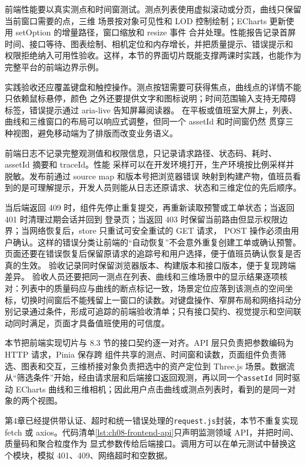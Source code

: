 前端性能要以真实测点和时间窗测试。测点列表使用虚拟滚动或分页，曲线只保留当前窗口需要的点，三维
场景按对象可见性和 LOD 控制绘制；ECharts 更新使用 setOption 的增量路径，窗口缩放和 resize 事件
合并处理。性能报告记录首屏时间、接口等待、图表绘制、相机定位和内存增长，并把质量提示、错误提示和
权限拒绝纳入可用性验收。这样，本节的界面切片既能支撑两课时实践，也能作为完整平台的前端边界示例。

实践验收还应覆盖键盘和触控操作。测点按钮需要可获得焦点，曲线点的详情不能只依赖鼠标悬停，颜色
之外还要提供文字和图标说明；时间范围输入支持无障碍标签，错误提示通过 aria-live 告知屏幕阅读器。
在平板或值班室大屏上，列表、曲线和三维窗口的布局可以响应式调整，但同一个 assetId 和时间窗仍然
贯穿三种视图，避免移动端为了排版而改变业务语义。

前端日志不记录完整观测值和权限信息，只记录请求路径、状态码、耗时、assetId 摘要和 traceId。性能
采样可以在开发环境打开，生产环境按比例采样并脱敏。发布前通过 source map 和版本号把浏览器错误
映射到构建产物，值班员看到的是可理解提示，开发人员则能从日志还原请求、状态和三维定位的先后顺序。

当后端返回 409 时，组件先停止重复提交，再重新读取预警或工单状态；当返回 401 时清理过期会话并回到
登录页；当返回 403 时保留当前路由但显示权限边界；当网络恢复后，store 只重试可安全重试的 GET 请求，
POST 操作必须由用户确认。这样的错误分类让前端的“自动恢复”不会意外重复创建工单或确认预警。
页面还要在错误恢复后保留原请求的追踪号和用户选择，便于值班员确认恢复是否真的生效。
验收记录同时保留浏览器版本、构建版本和接口版本，便于复现跨端差异。
验收人员还要把同一测点在列表、曲线和三维场景中的显示结果逐项核对：列表中的质量码应与曲线的断点标记一致，场景定位应落到该测点的空间坐标，切换时间窗后不能残留上一窗口的读数。对键盘操作、窄屏布局和网络抖动分别记录通过条件，形成可追踪的前端验收清单；只有接口契约、视觉提示和空间联动同时满足，页面才具备值班使用的可信度。

本节把前端实现切片与 8.3 节的接口契约逐一对齐。API 层只负责把参数编码为 HTTP 请求，Pinia 保存跨
组件共享的测点、时间窗和读数，页面组件负责筛选、图表和交互，三维桥接对象负责把选中的资产定位到
Three.js 场景。数据流从“筛选条件”开始，经由请求层和后端接口返回观测，再以同一个\texttt{assetId}
同时驱动 ECharts 曲线和三维相机；因此用户点击曲线或测点列表时，看到的是同一对象的两个视图。

第4章已经提供带认证、超时和统一错误处理的\texttt{request.js}封装，本节不重复实现 fetch
或 axios。代码清单\ref{lst:ch08-frontend-api}只声明监测领域 API，并把时间、质量码和聚合粒度作为
显式参数传给后端接口。调用方可以在单元测试中替换这个模块，模拟 401、409、网络超时和空数据。

